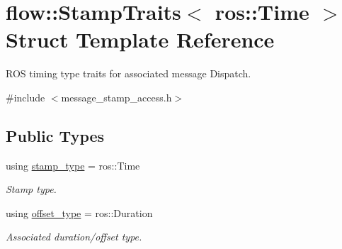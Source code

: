 \hypertarget{structflow_1_1_stamp_traits_3_01ros_1_1_time_01_4}{}\section{flow\+:\+:Stamp\+Traits$<$ ros\+:\+:Time $>$ Struct Template Reference}
\label{structflow_1_1_stamp_traits_3_01ros_1_1_time_01_4}


R\+OS timing type traits for associated message Dispatch.  




{\ttfamily \#include $<$message\+\_\+stamp\+\_\+access.\+h$>$}

\subsection*{Public Types}
\begin{DoxyCompactItemize}
\item 
\mbox{\label{structflow_1_1_stamp_traits_3_01ros_1_1_time_01_4_ab9356c00557c26b1e5447c75013a2a3f}} 
using \hyperlink{structflow_1_1_stamp_traits_3_01ros_1_1_time_01_4_ab9356c00557c26b1e5447c75013a2a3f}{stamp\+\_\+type} = ros\+::\+Time
\begin{DoxyCompactList}\small\item\em Stamp type. \end{DoxyCompactList}\item 
\mbox{\label{structflow_1_1_stamp_traits_3_01ros_1_1_time_01_4_a52fd431d0803e62cd978bf692c956c46}} 
using \hyperlink{structflow_1_1_stamp_traits_3_01ros_1_1_time_01_4_a52fd431d0803e62cd978bf692c956c46}{offset\+\_\+type} = ros\+::\+Duration
\begin{DoxyCompactList}\small\item\em Associated duration/offset type. \end{DoxyCompactList}\end{DoxyCompactItemize}
